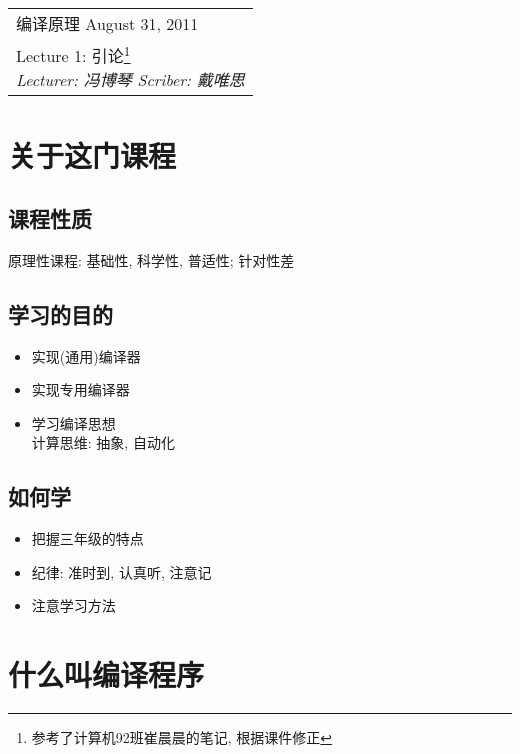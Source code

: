 \clearpage \noindent\begin{tabularx}{\linewidth}{|X|}
\hline \vskip -2mm
{\sf 编译原理} \hfill August 31, 2011 \\
{\centering \sf \large Lecture 1:
引论\footnote{参考了计算机92班崔晨晨的笔记, 根据课件修正} \\ }
\textsl{Lecturer: 冯博琴 \hfill Scriber: 戴唯思}\\ \hline
\end{tabularx}
\setcounter{section}{0}
\renewcommand{\thepage}{\lecture -\arabic{page}}
\def\lecture{1}

\section{关于这门课程}
    
    \subsection{课程性质}

        原理性课程: 基础性, 科学性, 普适性; 针对性差

    \subsection{学习的目的}

        \begin{itemize}
            \item 实现(通用)编译器
            \item 实现专用编译器
            \item 学习编译思想 \\
                计算思维: 抽象, 自动化
        \end{itemize}

    \subsection{如何学}

        \begin{itemize}
            \item 把握三年级的特点
            \item 纪律: 准时到, 认真听, 注意记
            \item 注意学习方法
        \end{itemize}

\section{什么叫编译程序}

